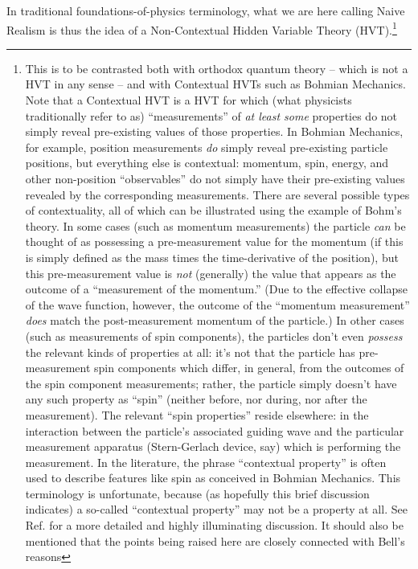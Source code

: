 \documentclass[12pt]{article}
\begin{document}
In traditional foundations-of-physics terminology, what we are here
calling Naive Realism is thus the idea of a Non-Contextual Hidden
Variable Theory (HVT).\footnote{This 
  is to be contrasted both with orthodox quantum theory
  -- which is not a HVT in any sense -- and with Contextual HVTs such
  as Bohmian Mechanics.  Note that a Contextual HVT is a HVT for which
  (what physicists traditionally refer to as) ``measurements'' of
  \emph{at least some} properties do not simply reveal pre-existing
  values of those properties.  In Bohmian Mechanics, for example,
  position measurements \emph{do} simply reveal pre-existing particle
  positions, but everything else is contextual:  momentum, spin,
  energy, and other non-position ``observables'' do not simply have
  their pre-existing values revealed by the corresponding
  measurements.  There are several possible types of contextuality,
  all of which can be illustrated using the example of Bohm's theory.   
  In some cases (such as momentum measurements) the particle \emph{can} be
  thought of as possessing a pre-measurement value for the momentum
  (if this is simply defined as the mass times the time-derivative of
  the position), but this pre-measurement value is \emph{not}
  (generally) the
  value that appears as the outcome of a ``measurement of the
  momentum.''  (Due to the effective collapse of the wave function,
  however, the outcome of the ``momentum measurement'' \emph{does}
  match the post-measurement momentum of the particle.)  In other 
  cases (such as measurements of spin components),
  the particles don't even \emph{possess} the relevant kinds of
  properties at all:  it's not that the particle has pre-measurement
  spin components which differ, in general, from the outcomes of the
  spin component measurements; rather, the particle simply doesn't
  have any such property as ``spin'' (neither before, nor during, nor
  after the measurement).  The relevant ``spin properties'' reside
  elsewhere:  in the interaction between the particle's associated
  guiding wave and the particular measurement apparatus (Stern-Gerlach
  device, say) which is performing the measurement.  In the
  literature, the phrase ``contextual property'' is often used to
  describe features like spin as conceived in Bohmian Mechanics.  This
  terminology is unfortunate, because (as hopefully this brief
  discussion indicates) a so-called ``contextual property'' may not be
  a property at all.  See Ref. \cite{nrao} for a more detailed and highly
  illuminating discussion.  It should also be mentioned that the
  points being raised here are closely connected with Bell's reasons
}
\end{document}
